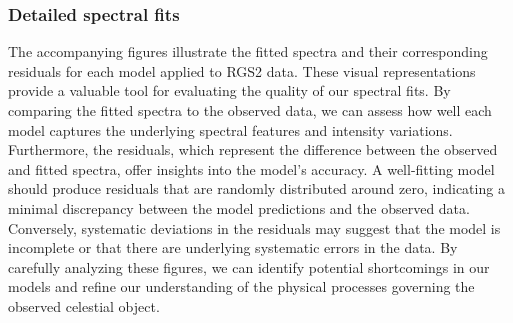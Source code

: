 			\subsubsection*{Detailed spectral fits}
				The accompanying figures illustrate the fitted spectra and their corresponding residuals for each model applied to RGS2 data. These visual representations provide a valuable tool for evaluating the quality of our spectral fits. By comparing the fitted spectra to the observed data, we can assess how well each model captures the underlying spectral features and intensity variations. Furthermore, the residuals, which represent the difference between the observed and fitted spectra, offer insights into the model's accuracy. A well-fitting model should produce residuals that are randomly distributed around zero, indicating a minimal discrepancy between the model predictions and the observed data. Conversely, systematic deviations in the residuals may suggest that the model is incomplete or that there are underlying systematic errors in the data. By carefully analyzing these figures, we can identify potential shortcomings in our models and refine our understanding of the physical processes governing the observed celestial object.
			\newpage
